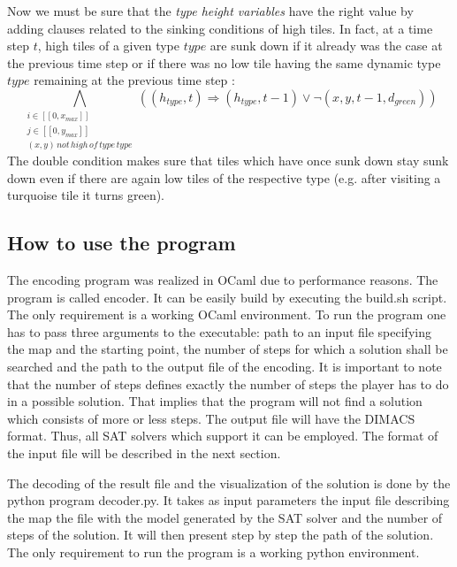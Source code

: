 \documentclass[a4paper, 12pt, titlepage]{article}
\begin{document}
Now we must be sure that the {\em type height variables} have the right value by
adding clauses related to the sinking conditions of high tiles. In fact, at a
time step $t$, high tiles of a given type $type$ are sunk down if it already was
the case at the previous time step or if there was no low tile having the same
dynamic type $type$ remaining at the previous time step :
\begin{equation}
\bigwedge \limits_{\substack{i \in [\![0, x_{max}]\!]\\
			     j \in [\![0, y_{max}]\!]\\
			     (x, y) \, not \, high \, of \, type \, type}}
((h_{type}, t) \Rightarrow (h_{type}, t-1) \vee \neg(x, y, t-1, d_{green}))
\end{equation}
The double condition makes sure that tiles which have once sunk down stay sunk down even if there are again low tiles of the respective type (e.g. after visiting a turquoise tile it turns green).


\subsection{How to use the program}

The encoding program was realized in OCaml due to performance reasons. 
The program is called encoder. 
It can be easily build by executing the build.sh script. 
The only requirement is a working OCaml environment. 
To run the program one has to pass three arguments to the executable: path to an input file specifying the map and the starting point, the number of steps for which a solution shall be searched and the path to the output file of the encoding. 
It is important to note that the number of steps defines exactly the number of steps the player has to do in a possible solution. 
That implies that the program will not find a solution which consists of more or less steps. 
The output file will have the DIMACS format. 
Thus, all SAT solvers which support it can be employed. 
The format of the input file will be described in the next section.

The decoding of the result file and the visualization of the solution is done by the python program decoder.py. 
It takes as input parameters the input file describing the map the file with the model generated by the SAT solver and the number of steps of the solution. 
It will then present step by step the path of the solution. 
The only requirement to run the program is a working python environment. 
\end{document}
